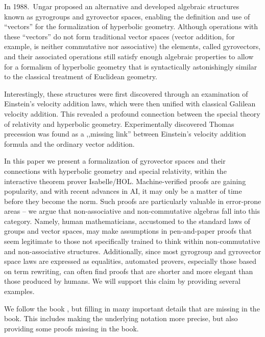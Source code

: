 \documentclass[a4paper]{article}
\theoremstyle{definition}
\begin{document}
In 1988.~Ungar \cite{ungar-analytic} proposed an alternative and
developed algebraic structures known as gyrogroups and gyrovector
spaces, enabling the definition and use of ``vectors'' for the
formalization of hyperbolic geometry. Although operations with these
``vectors'' do not form traditional vector spaces (vector addition,
for example, is neither commutative nor associative) the elements,
called gyrovectors, and their associated operations still satisfy
enough algebraic properties to allow for a formalism of hyperbolic
geometry that is syntactically astonishingly similar to the classical
treatment of Euclidean geometry.

Interestingly, these structures were first discovered through an
examination of Einstein's velocity addition laws, which were then
unified with classical Galilean velocity addition. This revealed a
profound connection between the special theory of relativity and
hyperbolic geometry. Experimentally discovered Thomas
precession\cite{ungar-analytic} was found as a ,,missing link''
between Einstein's velocity addition formula and the ordinary vector
addition.

In this paper we present a formalization of gyrovector spaces and
their connections with hyperbolic geometry and special relativity,
within the interactive theorem prover Isabelle/HOL. Machine-verified
proofs are gaining popularity, and with recent advances in AI, it may
only be a matter of time before they become the norm. Such proofs are
particularly valuable in error-prone areas -- we argue that
non-associative and non-commutative algebras fall into this
category. Namely, human mathematicians, accustomed to the standard
laws of groups and vector spaces, may make assumptions in
pen-and-paper proofs that seem legitimate to those not specifically
trained to think within non-commutative and non-associative
structures. Additionally, since most gyrogroup and gyrovector space
laws are expressed as equalities, automated provers, especially those
based on term rewriting, can often find proofs that are shorter and
more elegant than those produced by humans. We will support this claim
by providing several examples.

We follow the book \cite{ungar-analytic}, but filling in many
important details that are missing in the book. This includes making
the underlying notation more precise, but also providing some proofs
missing in the book.
\end{document}
